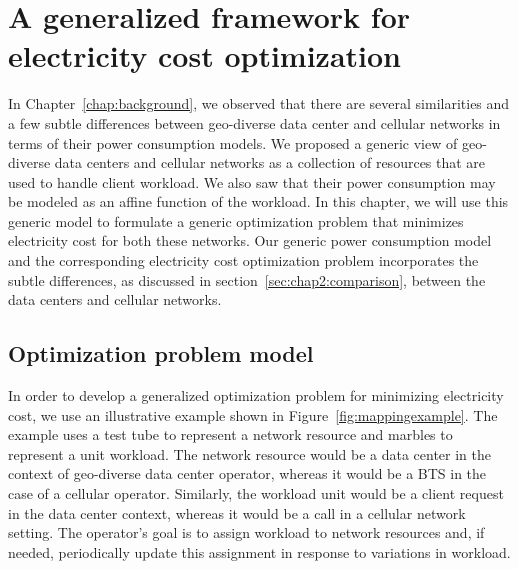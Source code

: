 \chapter{A generalized framework for electricity cost optimization}
\label{chap:framework} In Chapter~\ref{chap:background}, we observed that there are several similarities and a few subtle differences between geo-diverse data center and cellular networks in terms of their power consumption models. We proposed a generic view of geo-diverse data centers and cellular networks as a collection of resources that are used to handle client workload. We also saw that their power consumption may be modeled as an affine function of the workload. In this chapter, we will use this generic model to formulate a generic optimization problem that minimizes electricity cost for both these networks. Our generic power consumption model and the corresponding electricity cost optimization problem incorporates the subtle differences, as discussed in section~\ref{sec:chap2:comparison}, between the data centers and cellular networks.


\section{Optimization problem model} %
In order to develop a generalized optimization problem for minimizing electricity cost, we use an illustrative example shown in Figure~\ref{fig:mappingexample}. The example uses a test tube to represent a network resource and marbles to represent a unit workload. The network resource would be a data center in the context of geo-diverse data center operator, whereas it would be a BTS in the case of a cellular operator. Similarly, the workload unit would be a client request in the data center context, whereas it would be a call in a cellular network setting. The operator's goal is to assign workload to network resources and, if needed, periodically update this assignment in response to variations in workload.

